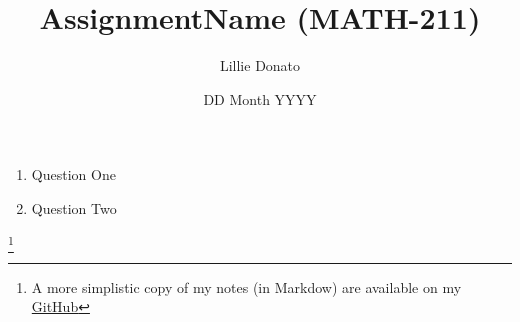 \documentclass{article}
\title{AssignmentName (MATH-211)}
\author{Lillie Donato}
\date{DD Month YYYY}
\newcommand\blfootnote[1]{
    \begingroup
    \renewcommand\thefootnote{}\footnote{#1}
    \addtocounter{footnote}{-1}
    \endgroup
}
\begin{document}
\maketitle

\begin{enumerate}
    \item Question One
    \item Question Two
\end{enumerate}

\blfootnote{A more simplistic copy of my notes (in Markdow) are available on my \href{https://github.com/onlinechronically/MATH-211}{GitHub}}
\end{document}
